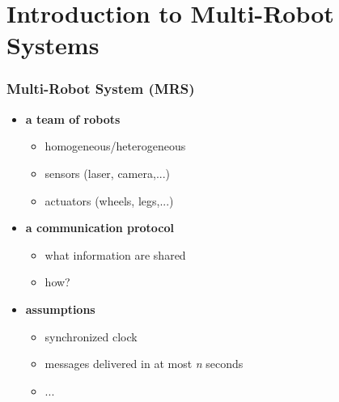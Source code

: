 \section{Introduction to Multi-Robot Systems}

\begin{frame}
	\frametitle{Multi-Robot System (MRS)}
	
	\Large
	
	\begin{itemize}
		\item \textbf{a team of robots}
			
			\begin{itemize}
				\item homogeneous/heterogeneous
				
				\item sensors (laser, camera,...)
				
				\item actuators (wheels, legs,...)
			\end{itemize}			
		\item \textbf{a communication protocol}
			
			\begin{itemize}
				\item what information are shared
				
				\item how?
			\end{itemize}
		\item \textbf{assumptions}
			
			\begin{itemize}
				\item synchronized clock
				
				\item messages delivered in at most \emph{n} seconds
				
				\item ...
			\end{itemize}
	\end{itemize}
\end{frame}

